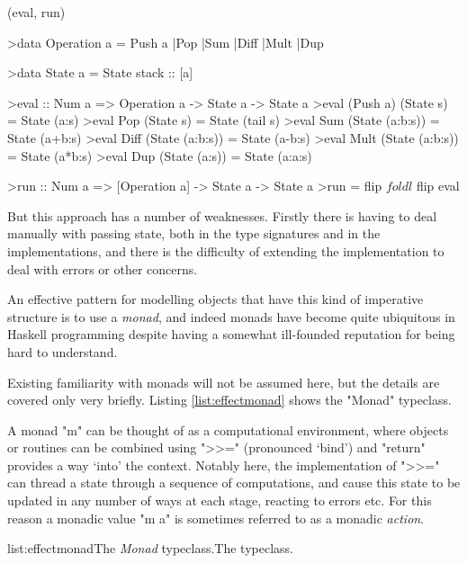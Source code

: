 \functions(eval, run)
\begin{haskell}

>data Operation a = Push a |Pop |Sum |Diff |Mult |Dup

>data State a = State {stack :: [a]}

>eval :: Num a => Operation a -> State a -> State a
>eval (Push a) (State s) = State (a:s)
>eval Pop  (State s) = State (tail s)
>eval Sum  (State (a:b:s)) = State (a+b:s)
>eval Diff (State (a:b:s)) = State (a-b:s)
>eval Mult (State (a:b:s)) = State (a*b:s)
>eval Dup  (State (a:s)) = State (a:a:s)

>run :: Num a => [Operation a] -> State a -> State a
>run = flip $ foldl $ flip eval

\end{haskell}
\noindent But this approach has a number of weaknesses. Firstly there is having to deal manually with passing state, both in the type signatures and in the implementations, and there is the difficulty of extending the implementation to deal with errors or other concerns.

An effective pattern for modelling objects that have this kind of imperative structure is to use a \emph{monad}, and indeed monads have become quite ubiquitous in Haskell programming despite having a somewhat ill-founded reputation for being hard to understand.

Existing familiarity with monads will not be assumed here, but the details are covered only very briefly. Listing \ref{list:effectmonad} shows the "Monad" typeclass.

A monad "m" can be thought of as a computational environment, where objects or routines can be combined using ">>=" (pronounced `bind') and "return" provides a way `into' the context. Notably here, the implementation of ">>=" can thread a state through a sequence of computations, and cause this state to be updated in any number of ways at each stage, reacting to errors etc. For this reason a monadic value "m a" is sometimes referred to as a monadic \emph{action}.

\vspace{-0.5em}
\begin{listing}{list:effectmonad}{The \emph{Monad} typeclass.}{The  typeclass.}{}
\end{listing}\vspace{-1.5em}

